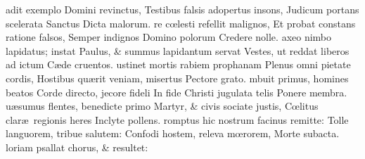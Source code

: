 \documentclass[letter,11pt]{book}
\begin{document}
\begin{multicols*}{2}
adit exemplo Domini revinctus,
\newline \indent Testibus falsis adopertus insons,
\newline \indent Judicum portans scelerata Sanctus
\newline \indent \indent Dicta malorum.
re c\oe lesti refellit malignos,
\newline \indent Et probat constans ratione falsos,
\newline \indent Semper indignos Domino polorum
\newline \indent \indent Credere nolle.
axeo nimbo lapidatus; instat
\newline \indent Paulus, \& summus lapidantum servat
\newline \indent Vestes, ut reddat liberos ad ictum
\newline \indent \indent C\ae de cruentos.
ustinet mortis rabiem prophanam
\newline \indent Plenus omni pietate cordis,
\newline \indent Hostibus qu\ae rit veniam, misertus
\newline \indent \indent Pectore grato.
mbuit primus, homines beatos
\newline \indent Corde directo, jecore fideli
\newline \indent In fide Christi jugulata telis
\newline \indent \indent Ponere membra.
u\ae sumus flentes, benedicte primo
\newline \indent Martyr, \& civis sociate justis,
\newline \indent C\oe litus clar\ae \ regionis heres
\newline \indent \indent Inclyte pollens.
romptus hic nostrum facinus remitte:
\newline \indent Tolle languorem, tribue salutem:
\newline \indent Confodi hostem, releva m\oe rorem,
\newline \indent \indent Morte subacta.
loriam psallat chorus, \& resultet:

\end{multicols*}
\end{document}
